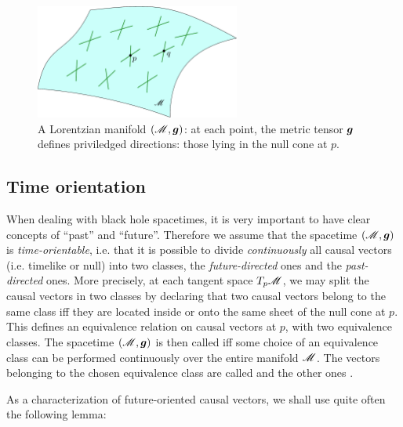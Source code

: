 \begin{figure}
\centerline{\includegraphics[width=0.6\textwidth]{fra_lorentz_manifold.pdf}}
\caption[]{\label{f:fra:lorentz_manifold} \footnotesize
A Lorentzian manifold $(\mathscr{M},\bm{g})$: at each point, the metric tensor $\bm{g}$
defines priviledged directions: those lying in the null cone at $p$.}
\end{figure}

\subsection{Time orientation} \label{s:fra:time_orientation}

When dealing with black hole spacetimes, it is very important to have clear
concepts of ``past'' and ``future''. Therefore we assume
that the spacetime $(\mathscr{M}, \bm{g})$ is \emph{time-orientable}, i.e. that it is possible to divide \emph{continuously} all causal vectors (i.e. timelike or null) into
two classes, the \emph{future-directed} ones and the \emph{past-directed} ones.
More precisely, at each tangent space $T_p\mathscr{M}$, we may split the causal
vectors in two classes by declaring that two causal
vectors belong to the same class iff they are located inside
or onto the same sheet of the null cone at $p$. This defines an equivalence
relation on causal vectors at $p$, with two equivalence classes. The spacetime
$(\mathscr{M},\bm{g})$ is then called  iff some choice of an equivalence class
can be performed continuously over the entire manifold $\mathscr{M}$.
The vectors belonging to the chosen equivalence class are called
 and the other ones
.

As a characterization of future-oriented causal vectors,
we shall use quite often the following lemma:

